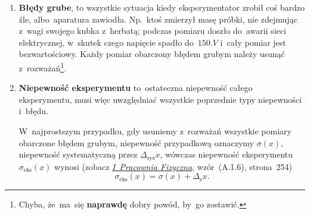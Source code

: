 \documentclass[a4paper,11pt]{article}
\newcommand{\tb}{\textbf}
\begin{document}
\begin{enumerate}
  O~ile opisany powyżej rodzaj błędów systematycznych jest łatwy
  do~zauważenia i~oszacowania, istnieją inne, znacznie trudniejsze
  do~wykrycia i~oszacowanie, przez co~są~dużo groźniejsze. Może~się
  zdarzyć że~efekt fizyczny, na~którym opieramy pomiar, lub~teoria
  na~podstawie której łączymy bezpośrednio zmierzone wielkości
  fizyczne z~poszukiwaną wielkością powoduje np. systematyczne
  zawyżanie wyników.

  Należy podkreślić, że~błędy systematyczne \tb{nie} muszą być znane
  eksperymentatorom, co jest dużym wyzwaniem przy przeprowadzaniu
  doświadczeń. Przykładowo, w~badanym procesie fizycznym występuje
  zjawisko, które nie zostało wzięte pod uwagę podczas projektowania
  eksperymentu. Bardziej przyziemnym przypadkiem, choć nie mniej
  groźnym dla wyników, jest błąd w~kodzie programu obsługującym
  aparaturę\footnote{Niestety, kod dużych programów zawsze zawiera
    jakieś błędy, zwykle bardzo małe. Jednak znane~są przypadki,
    gdy~błędny kod postawiły całe lata badań pod znakiem zapytania.},
  który błędnie przypisuje wartości pewnym mierzonym wielkościom.
  Z~tego powodu naprawdę ważne wielkości mierzy~się w~kilku
  niezależnych eksperymentach, najlepiej za~pomocą różnych zjawisk
  fizycznych.
\item \textbf{Błędy grube}, to wszystkie sytuacja kiedy
  eksperymentator zrobił coś bardzo źle, albo~aparatura zawiodła.
  Np.~ktoś zmierzył masę próbki, nie zdejmując z~wagi swojego kubka
  z~herbatą; podczas pomiaru doszło do~awarii sieci elektrycznej,
  w~skutek czego napięcie spadło do~$150 \si{.V}$ i~cały pomiar jest
  bezwartościowy. Każdy pomiar obarczony błędem grubym należy usunąć
  z~rozważań\footnote{Chyba, że~ma~się \tb{naprawdę} dobry powód,
    by~go zostawić.}.
\item \textbf{Niepewność eksperymentu} to~ostateczna niepewność całego
  eksperymentu, musi więc uwzględniać wszystkie poprzednie typy
  niepewności i~błędu.

  W~najprostszym przypadku, gdy usuniemy z~rozważań wszystkie pomiary
  obarczone błędem grubym, niepewność przypadkową oznaczymy
  $\sigma( x )$, niepewność systematyczną przez
  $\Delta_{ \textrm{sys} } x$, wówczas niepewność eksperymentu
  $\sigma_{ \textrm{eks} }( x )$ wynosi (zobacz
  \href{http://www.1pf.if.uj.edu.pl/documents/5046939/5227638/skrypt.pdf}{\emph{I~Pracownia
      Fizyczna}}, wzór~(A.1.6), strona~254)
  \begin{equation}
    \label{eq:1}
    \sigma_{ \textrm{eks} }( x ) = \sigma( x ) + \Delta_{ \textrm{s} } x.
  \end{equation}


\end{enumerate}
\end{document}
